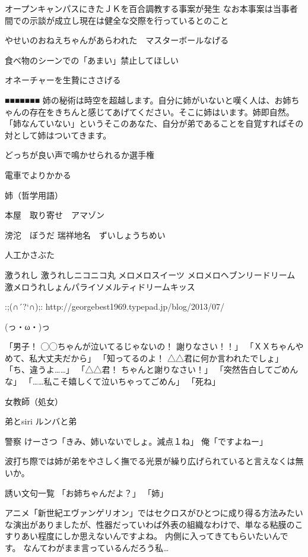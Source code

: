 オープンキャンパスにきたＪＫを百合調教する事案が発生
なお本事案は当事者間での示談が成立し現在は健全な交際を行っているとのこと

やせいのおねえちゃんがあらわれた　マスターボールなげる

食べ物のシーンでの「あまい」禁止してほしい

オネーチャーを生贄にささげる


■■■■■■■
姉の秘術は時空を超越します。自分に姉がいないと嘆く人は、お姉ちゃんの存在をきちんと感じてあげてください。そこに姉はいます。姉即自然。
「姉なんていない」というそこのあなた、自分が弟であることを自覚すればその対として姉はついてきます。


どっちが良い声で鳴かせられるか選手権

電車でよりかかる

姉（哲学用語）

本屋　取り寄せ　アマゾン

滂沱　ぼうだ
瑞祥地名　ずいしょうちめい

人工かさぶた




激うれし
激うれしニコニコ丸
メロメロスイーツ
メロメロヘブンリードリーム
激メロうれしょんパライソメルティドリームキッス

:;(∩´?`∩);:
http://georgebest1969.typepad.jp/blog/2013/07/%

(っ・ω・)っ


「男子！ ◯◯ちゃんが泣いてるじゃないの！ 謝りなさい！！」 「ＸＸちゃんやめて、私大丈夫だから」 「知ってるのよ！ △△君に何か言われたでしょ」 「ち、違うよ……」 「△△君！ ちゃんと謝りなさい！」 「突然告白してごめんな」 「……私こそ嬉しくて泣いちゃってごめん」 「死ね」

女教師（処女）

弟とsiri
ルンバと弟

警察
けーさつ「きみ、姉いないでしょ。減点１ね」
俺「ですよねー」

波打ち際では姉が弟をやさしく撫でる光景が繰り広げられていると言えなくは無いか。



誘い文句一覧
「お姉ちゃんだよ？」
「姉」

アニメ「新世紀エヴァンゲリオン」ではセクロスがひとつに成り得る方法みたいな演出がありましたが、性器だっていわば外表の組織なわけで、単なる粘膜のこすりあい程度にしか思えないんですよね。
内側に入ってきてもらいたいんです。
なんてわがまま言っているんだろう私…






